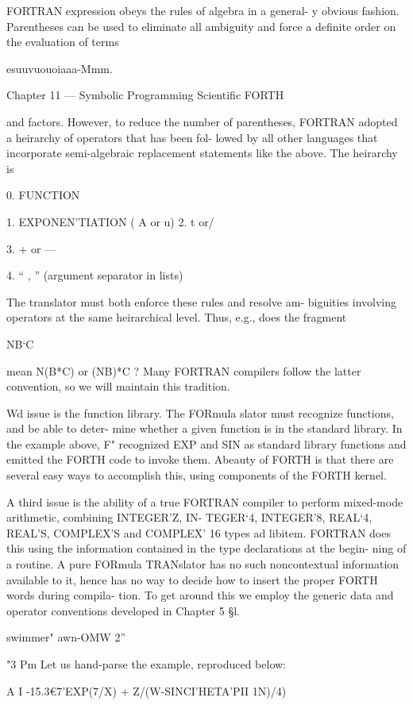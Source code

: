 FORTRAN expression obeys the rules of algebra in a general-
y obvious fashion. Parentheses can be used to eliminate all
ambiguity and force a definite order on the evaluation of terms

esuuvuouoiaaa-Mmm.

Chapter 11 — Symbolic Programming Scientific FORTH

and factors. However, to reduce the number of parentheses,
FORTRAN adopted a heirarchy of operators that has been fol-
lowed by all other languages that incorporate semi-algebraic
replacement statements like the above. The heirarchy is

0. FUNCTION

1. EXPONEN'TIATION ( A or u)
2. t or/

3. + or —

4. “ , ” (argument separator in lists)

The translator must both enforce these rules and resolve am-
biguities involving operators at the same heirarchical level. Thus,
e.g., does the fragment

NB‘C

mean N(B*C) or (NB)*C ? Many FORTRAN compilers follow
the latter convention, so we will maintain this tradition.

Wd issue is the function library. The FORmula
slator must recognize functions, and be able to deter-
mine whether a given function is in the standard library. In the
example above, F" recognized EXP and SIN as standard library
functions and emitted the FORTH code to invoke them. Abeauty
of FORTH is that there are several easy ways to accomplish this,
using components of the FORTH kernel.

A third issue is the ability of a true FORTRAN compiler to
perform mixed-mode arithmetic, combining INTEGER'Z, IN-
TEGER‘4, INTEGER'8, REAL‘4, REAL'S, COMPLEX'S
and COMPLEX' 16 types ad libitem. FORTRAN does this using
the information contained in the type declarations at the begin-
ning of a routine. A pure FORmula TRANslator has no such
noncontextual information available to it, hence has no way to
decide how to insert the proper FORTH words during compila-
tion. To get around this we employ the generic data and operator
conventions developed in Chapter 5 §l.

swimmer" awn-OMW 2”

"3 Pm
Let us hand-parse the example, reproduced below:

A I -15.3€7'EXP(7/X) + Z/(W-SINCI'HETA'PII 1N)/4)

